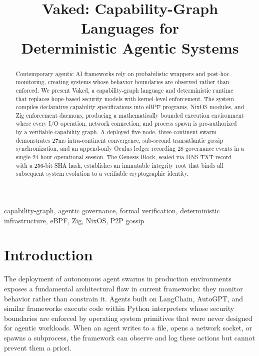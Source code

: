 \documentclass[conference]{IEEEtran}
\begin{document}
\title{Vaked: Capability-Graph Languages for\\Deterministic Agentic Systems}

\author{
}

\maketitle

\begin{abstract}
Contemporary agentic AI frameworks rely on probabilistic wrappers and post-hoc
monitoring, creating systems whose behavior boundaries are observed rather than
enforced. We present Vaked, a capability-graph language and deterministic runtime
that replaces hope-based security models with kernel-level enforcement. The system
compiles declarative capability specifications into eBPF programs, NixOS modules,
and Zig enforcement daemons, producing a mathematically bounded execution
environment where every I/O operation, network connection, and process spawn is
pre-authorized by a verifiable capability graph. A deployed five-node, three-continent
swarm demonstrates 27ms intra-continent convergence, sub-second transatlantic gossip
synchronization, and an append-only Oculus ledger recording 28 governance events
in a single 24-hour operational session. The Genesis Block, sealed via DNS TXT
record with a 256-bit SHA hash, establishes an immutable integrity root that binds
all subsequent system evolution to a verifiable cryptographic identity.
\end{abstract}

\begin{IEEEkeywords}
capability-graph, agentic governance, formal verification, deterministic infrastructure, eBPF, Zig, NixOS, P2P gossip
\end{IEEEkeywords}

\section{Introduction}

The deployment of autonomous agent swarms in production environments exposes a
fundamental architectural flaw in current frameworks: they monitor behavior rather
than constrain it. Agents built on LangChain, AutoGPT, and similar frameworks
execute code within Python interpreters whose security boundaries are enforced by
operating system primitives that were never designed for agentic workloads. When
an agent writes to a file, opens a network socket, or spawns a subprocess, the
framework can observe and log these actions but cannot prevent them a priori.
\end{document}
